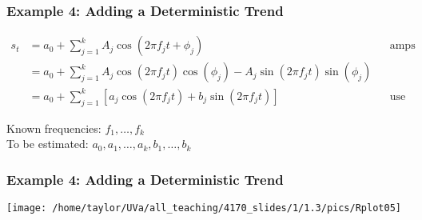 \documentclass{beamer}
\begin{document}

\begin{frame}[fragile]
\frametitle{Example 4: Adding a Deterministic Trend}

\begin{align*}
s_t &= a_0 + \sum_{j=1}^k A_j \cos(2\pi f_j t + \phi_j) && \text{amps and phase} \\
&= a_0 + \sum_{j=1}^k A_j \cos(2\pi f_j t) \cos( \phi_j) - A_j\sin(2 \pi f_j t) \sin(\phi_j)  \\
&= a_0 + \sum_{j =1}^k \left[a_j\cos(2\pi f_j t) + b_j\sin(2\pi f_j t) \right] && \text{use this one}
\end{align*}

Known frequencies: $f_1, \ldots, f_k$\\
To be estimated: $a_0, a_1, \ldots, a_k, b_1, \ldots, b_k$
\end{frame}


\begin{frame}[fragile]
\frametitle{Example 4: Adding a Deterministic Trend}

\begin{center}
\texttt{[image: /home/taylor/UVa/all\_teaching/4170\_slides/1/1.3/pics/Rplot05]}
\end{center}
\end{frame}
\end{document}
